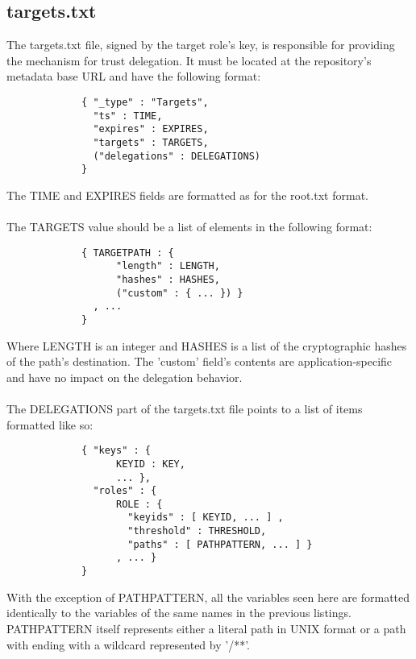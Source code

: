 \documentclass{article}
\begin{document}
\subsection{targets.txt}
The targets.txt file, signed by the target role's key, is responsible for providing
the mechanism for trust delegation. It must be located at the repository's 
metadata base URL and have the following format:

\begin{verbatim}
             { "_type" : "Targets",
               "ts" : TIME,
               "expires" : EXPIRES,
               "targets" : TARGETS,
               ("delegations" : DELEGATIONS)
             }
\end{verbatim}

The TIME and EXPIRES fields are formatted as for the root.txt format. 
\\\\
The TARGETS value should be a list of elements in the following format:

\begin{verbatim}
             { TARGETPATH : {
                   "length" : LENGTH,
                   "hashes" : HASHES,
                   ("custom" : { ... }) }
               , ...
             }
\end{verbatim}

Where LENGTH is an integer and HASHES is a list of the cryptographic hashes of
the path's destination. The 'custom' field's contents are application-specific
and have no impact on the delegation behavior.
\\\\
The DELEGATIONS part of the targets.txt file points to a list of items formatted
like so:

\begin{verbatim}
             { "keys" : {
                   KEYID : KEY,
                   ... },
               "roles" : {
                   ROLE : {
                     "keyids" : [ KEYID, ... ] ,
                     "threshold" : THRESHOLD,
                     "paths" : [ PATHPATTERN, ... ] }
                   , ... }
             }
\end{verbatim}

With the exception of PATHPATTERN, all the variables seen here are formatted
identically to the variables of the same names in the previous listings. PATHPATTERN
itself represents either a literal path in UNIX format or a path with ending with 
a wildcard represented by '/**'.
\end{document}
